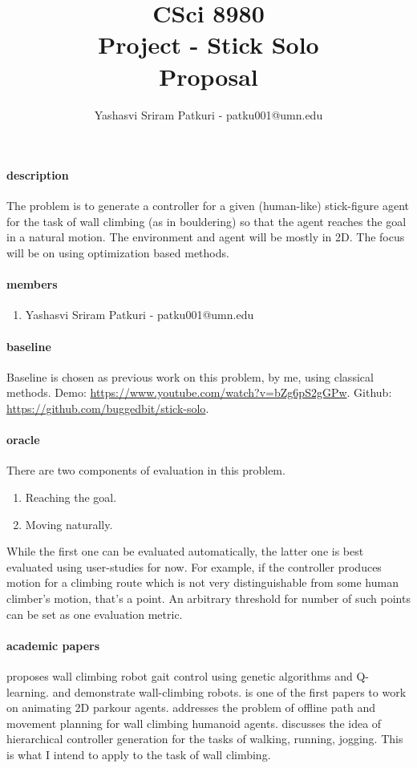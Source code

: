 \documentclass[12pt]{article}
\title{CSci 8980\\Project - Stick Solo\\Proposal}
\author{
Yashasvi Sriram Patkuri - patku001@umn.edu\\
}
\begin{document}
\maketitle

\paragraph{description}
The problem is to generate a controller for a given (human-like) stick-figure agent for the task of wall climbing (as in bouldering) so that the agent reaches the goal in a natural motion.
The environment and agent will be mostly in 2D.
The focus will be on using optimization based methods.

\paragraph{members}
\begin{enumerate}[nolistsep]
    \item Yashasvi Sriram Patkuri - patku001@umn.edu
\end{enumerate}

\paragraph{baseline}
Baseline is chosen as previous work on this problem, by me, using classical methods.
Demo: \url{https://www.youtube.com/watch?v=bZg6pS2gGPw}.
Github: \url{https://github.com/buggedbit/stick-solo}.

\paragraph{oracle}
There are two components of evaluation in this problem.
\begin{enumerate}[nolistsep]
    \item Reaching the goal.
    \item Moving naturally.
\end{enumerate}
While the first one can be evaluated automatically, the latter one is best evaluated using user-studies for now.
For example, if the controller produces motion for a climbing route which is not very distinguishable from some human climber's motion, that's a point.
An arbitrary threshold for number of such points can be set as one evaluation metric.

\paragraph{academic papers}
\cite{bull1995adaptive} proposes wall climbing robot gait control using genetic algorithms and Q-learning.
\cite{Grieco1998ASC} and \cite{351225} demonstrate wall-climbing robots.
\cite{kalisiak2001grasp} is one of the first papers to work on animating 2D parkour agents.
\cite{10.1145/3072959.3073707} addresses the problem of offline path and movement planning for wall climbing humanoid agents.
\cite{2017-TOG-deepLoco} discusses the idea of hierarchical controller generation for the tasks of walking, running, jogging. This is what I intend to apply to the task of wall climbing.
\end{document}
